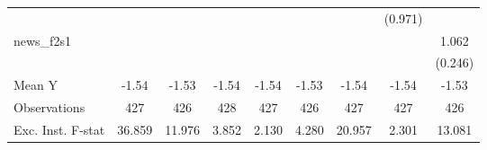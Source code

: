 {\begin{tabular}{l*{8}{c}}
            &                     &                     &                     &                     &                     &                     &     (0.971)         &                     \\
\addlinespace
news\_f2s1   &                     &                     &                     &                     &                     &                     &                     &       1.062\sym{***}\\
            &                     &                     &                     &                     &                     &                     &                     &     (0.246)         \\
\midrule
Mean Y      &       -1.54         &       -1.53         &       -1.54         &       -1.54         &       -1.53         &       -1.54         &       -1.54         &       -1.53         \\
Observations&         427         &         426         &         428         &         427         &         426         &         427         &         427         &         426         \\
Exc. Inst. F-stat&      36.859         &      11.976         &       3.852         &       2.130         &       4.280         &      20.957         &       2.301         &      13.081         \\
\bottomrule
\end{tabular}
}
